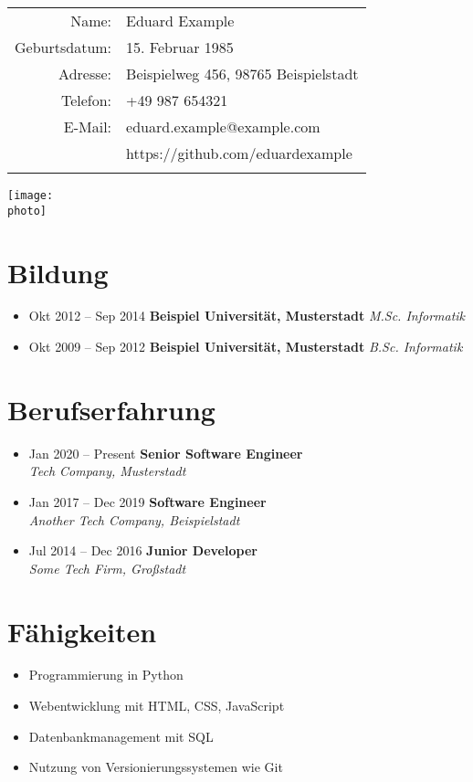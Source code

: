 \documentclass{scrartcl}
\makeatletter
\newcommand{\name}{Max Mustermann}
\newcommand{\birthdate}{1. Januar 1990}
\newcommand{\address}{Musterstraße 123, 12345 Musterstadt}
\newcommand{\phone}{+49 123 456789}
\newcommand{\email}{max.mustermann@example.com}
\newcommand{\photo}{photo.jpg} %
\newcommand{\personaldata}{
    \begin{minipage}{0.75\textwidth}
        \begin{tabular}{rl}
        Name: & \name \\
        Geburtsdatum: & \birthdate \\
        Adresse: & \address \\
        Telefon: & \phone \\
        E-Mail: & \email \\
        \ifthenelse{\isundefined{\github}}{}{GitHub: & \github \\}
        \end{tabular}
    \end{minipage}
    \begin{minipage}{0.24\textwidth}
        \raggedleft
        \texttt{[image: \\photo]} %
    \end{minipage}
    \vspace{.2cm} %
}
\newcommand{\educationitem}[3]{%
    \item #1 \textbf{#2} \textit{#3}
}
\newcommand{\education}[1]{
    \section*{Bildung}
    \begin{itemize}[left=0pt]
        #1
    \end{itemize}
}
\newcommand{\careeritem}[3]{%
    \item #1 \hfill \textbf{#2} \\
    \textit{#3}
}
\newcommand{\career}[1]{
    \section*{Berufserfahrung}
    \begin{itemize}[left=0pt]
        #1
    \end{itemize}
}
\newcommand{\skills}[1]{
    \section*{Fähigkeiten}
    \begin{itemize}[left=0pt, label={--}]
        #1
    \end{itemize}
}
\makeatother
\begin{document}
\renewcommand{\name}{Eduard Example}
\renewcommand{\birthdate}{15. Februar 1985}
\renewcommand{\address}{Beispielweg 456, 98765 Beispielstadt}
\renewcommand{\phone}{+49 987 654321}
\renewcommand{\email}{eduard.example@example.com}
\renewcommand{\photo}{photo.jpg}
\newcommand{\github}{https://github.com/eduardexample}  %

\personaldata

\education{
    \educationitem{Okt 2012 -- Sep 2014}{Beispiel Universität, Musterstadt}{M.Sc. Informatik}
    \educationitem{Okt 2009 -- Sep 2012}{Beispiel Universität, Musterstadt}{B.Sc. Informatik}
}

\career{
    \careeritem{Jan 2020 -- Present}{Senior Software Engineer}{Tech Company, Musterstadt}
    \careeritem{Jan 2017 -- Dec 2019}{Software Engineer}{Another Tech Company, Beispielstadt}
    \careeritem{Jul 2014 -- Dec 2016}{Junior Developer}{Some Tech Firm, Großstadt}
}

\skills{
    \item Programmierung in Python
    \item Webentwicklung mit HTML, CSS, JavaScript
    \item Datenbankmanagement mit SQL
    \item Nutzung von Versionierungssystemen wie Git
}
\end{document}

